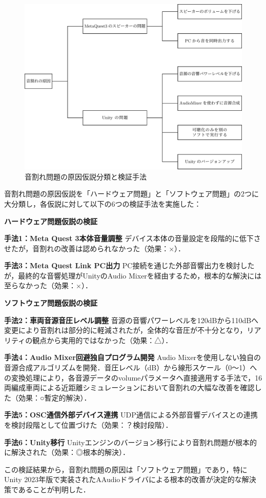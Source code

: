 \documentclass[10pt]{jsarticle}
\begin{document}
\begin{figure}[b]
	\begin{center}
		\includegraphics[width=0.5\linewidth]{pic/audio_distortion_flowchart.png}
		\caption{音割れ問題の原因仮説分類と検証手法}
		\label{fig:audio_distortion_solutions}
	\end{center}
\end{figure}

音割れ問題の原因仮説を「ハードウェア問題」と「ソフトウェア問題」の2つに大分類し，各仮説に対して以下の6つの検証手法を実施した：

\textbf{ハードウェア問題仮説の検証}

\textbf{手法1：Meta Quest 3本体音量調整}
デバイス本体の音量設定を段階的に低下させたが，音割れの改善は認められなかった（効果：×）．

\textbf{手法3：Meta Quest Link PC出力}
PC接続を通じた外部音響出力を検討したが，最終的な音響処理がUnityのAudio Mixerを経由するため，根本的な解決には至らなかった（効果：×）．

\textbf{ソフトウェア問題仮説の検証}

\textbf{手法2：車両音源音圧レベル調整}
音源の音響パワーレベルを120dBから110dBへ変更により音割れは部分的に軽減されたが，全体的な音圧が不十分となり，リアリティの観点から実用的ではなかった（効果：△）．

\textbf{手法4：Audio Mixer回避独自プログラム開発}
Audio Mixerを使用しない独自の音源合成アルゴリズムを開発．音圧レベル（dB）から線形スケール（0〜1）への変換処理により，各音源データのvolumeパラメータへ直接適用する手法で，16両編成車両による近距離シミュレーションにおいて音割れの大幅な改善を確認した（効果：○暫定的解決）．

\textbf{手法5：OSC通信外部デバイス連携}
UDP通信による外部音響デバイスとの連携を検討段階として位置づけた（効果：？検討段階）．

\textbf{手法6：Unity移行}
Unityエンジンのバージョン移行により音割れ問題が根本的に解決された（効果：◎根本的解決）．

この検証結果から，音割れ問題の原因は「ソフトウェア問題」であり，特にUnity 2023年版で実装されたAAudioドライバによる根本的改善が決定的な解決策であることが判明した．
\end{document}
